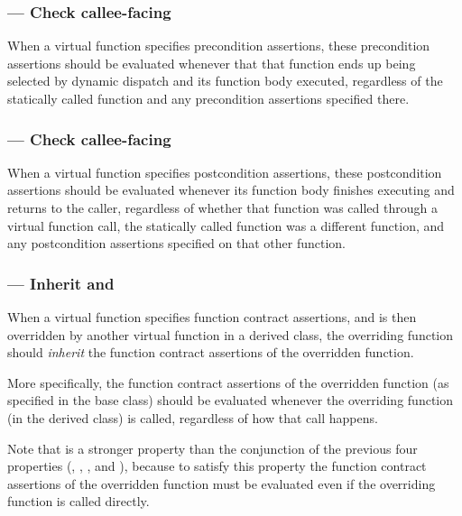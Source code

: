 \subsubsection{ --- Check callee-facing }

When a virtual function specifies precondition assertions, these precondition assertions should be evaluated whenever that that function ends up being selected by dynamic dispatch and its function body executed, regardless of the statically called function and any precondition assertions specified there.


\subsubsection{ --- Check callee-facing }

When a virtual function specifies postcondition assertions, these postcondition assertions should be evaluated whenever its function body finishes executing and returns to the caller, regardless of whether that function was called through a virtual function call, the statically called function was a different function, and any postcondition assertions specified on that other function.


\subsubsection{ --- Inherit  and }


When a virtual function specifies function contract assertions, and is then overridden by another virtual function in a derived class, the overriding function should \emph{inherit} the function contract assertions of the overridden function.

More specifically, the function contract assertions of the overridden function (as specified in the base class) should be evaluated whenever the overriding function (in the derived class) is called, regardless of how that call happens.

Note that  is a stronger property than the conjunction of the previous four properties (, , , and ), because to satisfy this property the function contract assertions of the overridden function must be evaluated even if the overriding function is called directly.

